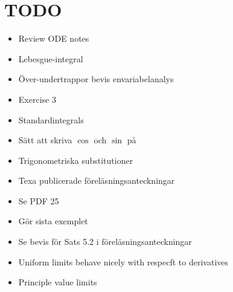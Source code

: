 \section{TODO}\par
\begin{itemize}
  \item Review ODE notes
  \item Lebesgue-integral
  \item Över-undertrappor bevis envariabelanalys
  \item Exercise 3
  \item Standardintegrals
  \item Sätt att skriva $\cos$ och $\sin$ på
  \item Trigonometriska substitutioner
  \item Texa publicerade föreläsningsanteckningar 
  \item Se PDF 25
  \item Gör sista exemplet
  \item Se bevis för Sats 5.2 i föreläsningsanteckningar
  \item Uniform limits behave nicely with respecft to derivatives
  \item Principle value limits
\end{itemize}
